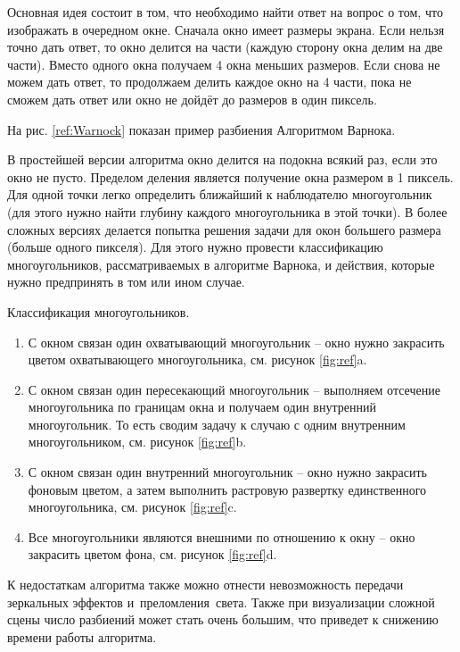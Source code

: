 Основная идея состоит в том, что необходимо найти ответ на вопрос о том, что изображать в очередном окне.
Сначала окно имеет размеры экрана. Если нельзя точно дать ответ, то окно делится на части (каждую сторону окна делим на две части).
Вместо одного окна получаем 4 окна меньших размеров.
Если снова не можем дать ответ, то продолжаем делить каждое окно на 4 части, пока не сможем дать ответ или окно не дойдёт до размеров в один пиксель.

На рис. \ref{ref:Warnock} показан пример разбиения Алгоритмом Варнока.

В простейшей версии алгоритма окно делится на подокна всякий раз, если это окно не пусто. Пределом деления является получение окна размером в 1 пиксель. Для одной точки легко определить ближайший к наблюдателю многоугольник (для этого нужно найти глубину каждого многоугольника в этой точки). В более сложных версиях делается попытка решения задачи для окон большего размера (больше одного пикселя). Для этого нужно провести классификацию многоугольников, рассматриваемых в алгоритме Варнока, и действия, которые нужно предпринять в том или ином случае.

Классификация многоугольников.
\begin{enumerate}
	\item С окном связан один охватывающий многоугольник -- окно нужно закрасить цветом охватывающего многоугольника, см. рисунок \ref{fig:ref}a.
	\item С окном связан один пересекающий многоугольник -- выполняем отсечение многоугольника по границам окна и получаем один внутренний многоугольник.
	      То есть сводим задачу к случаю с одним внутренним многоугольником, см. рисунок \ref{fig:ref}b.
	\item С окном связан один внутренний многоугольник -- окно нужно закрасить фоновым цветом, а затем выполнить растровую развертку единственного многоугольника, см. рисунок \ref{fig:ref}c.
	\item Все многоугольники являются внешними по отношению к окну -- окно закрасить цветом фона, см. рисунок \ref{fig:ref}d.
\end{enumerate}

\begin{figure}[ht!]
\end{figure}

К недостаткам алгоритма также можно отнести невозможность передачи зеркальных эффектов и преломления света. Также при визуализации сложной сцены число разбиений может стать очень большим, что приведет к снижению времени работы алгоритма.

